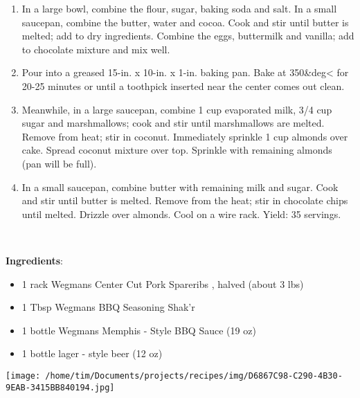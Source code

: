 \documentclass[11pt, twoside, openany]{book}
\begin{document}
\vspace{-3mm}\begin{enumerate}\setlength\itemsep{-1mm}
\item In a large bowl, combine the flour, sugar, baking soda and salt. In a small saucepan, combine the butter, water and cocoa. Cook and stir until butter is melted; add to dry ingredients. Combine the eggs, buttermilk and vanilla; add to chocolate mixture and mix well. 
\item  Pour into a greased 15-in. x 10-in. x 1-in. baking pan. Bake at 350&deg< for 20-25 minutes or until a toothpick inserted near the center comes out clean. 
\item  Meanwhile, in a large saucepan, combine 1 cup evaporated milk, 3/4 cup sugar and marshmallows; cook and stir until marshmallows are melted. Remove from heat; stir in coconut. Immediately sprinkle 1 cup almonds over cake. Spread coconut mixture over top. Sprinkle with remaining almonds (pan will be full). 
\item  In a small saucepan, combine butter with remaining milk and sugar. Cook and stir until butter is melted. Remove from the heat; stir in chocolate chips until melted. Drizzle over almonds. Cool on a wire rack. Yield: 35 servings.
\end{enumerate}
 \label{braised-barbecue-pork-spareribs}\hfill\textit{}\\
\begin{minipage}[t]{0.8\linewidth}
\textbf{Ingredients}:\vspace{-3mm}
\begin{multicols}{2}
\begin{itemize}\setlength\itemsep{-1mm}
\item 1 rack Wegmans Center Cut Pork Spareribs , halved (about 3 lbs)
\item 1 Tbsp Wegmans BBQ Seasoning Shak'r
\item 1 bottle Wegmans Memphis - Style BBQ Sauce (19 oz)
\item 1 bottle lager - style beer (12 oz)
\end{itemize}
\end{multicols}
\end{minipage}
\begin{minipage}[t]{0.2\linewidth}
\centering \strut\vspace*{-\baselineskip}\newline
\texttt{[image: /home/tim/Documents/projects/recipes/img/D6867C98-C290-4B30-9EAB-3415BB840194.jpg]}\\
\end{minipage}\vspace{3mm}
\end{document}
